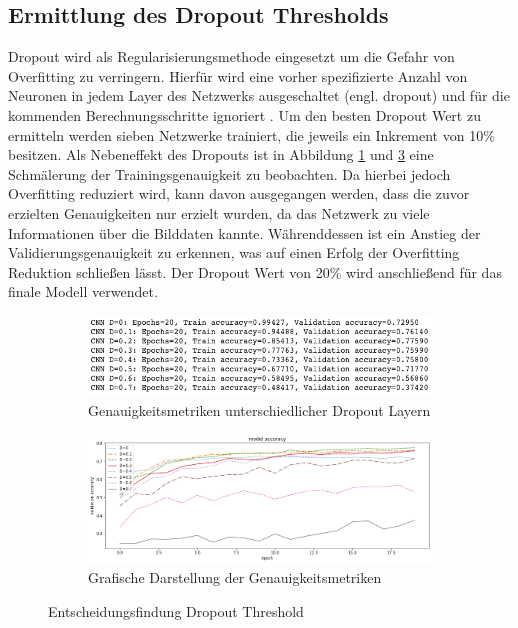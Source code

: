 \subsection{Ermittlung des Dropout Thresholds}

Dropout wird als Regularisierungsmethode eingesetzt um die Gefahr von Overfitting zu verringern. Hierfür wird eine vorher spezifizierte Anzahl von Neuronen in jedem Layer des Netzwerks ausgeschaltet (engl. dropout) und für die kommenden Berechnungsschritte ignoriert \cite[1929-1958]{JMLR:v15:srivastava14a}. Um den besten Dropout Wert zu ermitteln werden sieben Netzwerke trainiert, die jeweils ein Inkrement von 10\% besitzen. Als Nebeneffekt des Dropouts ist in Abbildung \ref{fig:dropout_results} und \ref{fig:dropout_graph_results} eine Schmälerung der Trainingsgenauigkeit zu beobachten. Da hierbei jedoch Overfitting reduziert wird, kann davon ausgegangen werden, dass die zuvor erzielten Genauigkeiten nur erzielt wurden, da das Netzwerk zu viele Informationen über die Bilddaten kannte. Währenddessen ist ein Anstieg der Validierungsgenauigkeit zu erkennen, was auf einen Erfolg der Overfitting Reduktion schließen lässt. Der Dropout Wert von 20\% wird anschließend für das finale Modell verwendet. 

\begin{figure}[htb]
	\centering
	\begin{subfigure}[ht]{.9\textwidth}
		\includegraphics[width=\textwidth]{images/dropout}
		\caption{Genauigkeitsmetriken unterschiedlicher Dropout Layern}
		\label{fig:dropout_results}
	\end{subfigure}\hfill%
	\begin{subfigure}[ht]{.9\textwidth}
		\includegraphics[width=\textwidth]{images/dropout_graph}
		\caption{Grafische Darstellung der Genauigkeitsmetriken}
		\label{fig:dropout_graph_results}
	\end{subfigure}\hfill%
	\caption{Entscheidungsfindung Dropout Threshold}
\end{figure}

